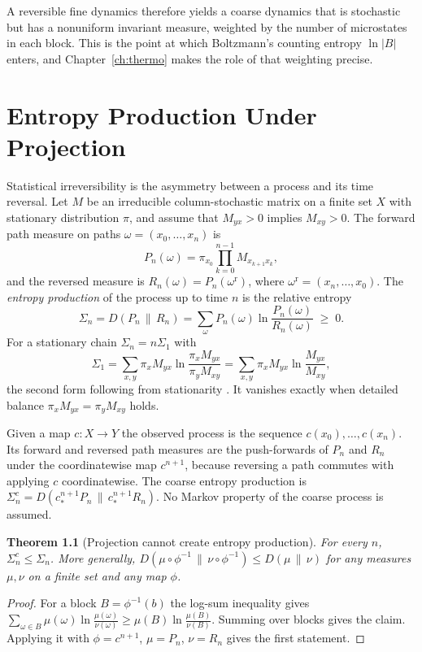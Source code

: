 \documentclass[11pt,oneside]{book}
\newtheorem{theorem}{Theorem}[chapter]
\theoremstyle{definition}
\theoremstyle{remark}
\begin{document}
A reversible fine dynamics therefore yields a coarse dynamics that is stochastic but has a nonuniform invariant measure, weighted by the number of microstates in each block. This is the point at which Boltzmann's counting entropy $\ln|B|$ enters, and Chapter~\ref{ch:thermo} makes the role of that weighting precise.

\chapter{Entropy Production Under Projection}\label{ch:entropy}

Statistical irreversibility is the asymmetry between a process and its time reversal. Let $M$ be an irreducible column-stochastic matrix on a finite set $X$ with stationary distribution $\pi$, and assume that $M_{yx}>0$ implies $M_{xy}>0$. The forward path measure on paths $\omega=(x_0,\dots,x_n)$ is
\[
P_n(\omega)=\pi_{x_0}\prod_{k=0}^{n-1}M_{x_{k+1}x_k},
\]
and the reversed measure is $R_n(\omega)=P_n(\omega^{\mathrm r})$, where $\omega^{\mathrm r}=(x_n,\dots,x_0)$. The \emph{entropy production} of the process up to time $n$ is the relative entropy
\[
\Sigma_n=D(P_n\,\|\,R_n)=\sum_\omega P_n(\omega)\ln\frac{P_n(\omega)}{R_n(\omega)}\;\geq\;0 .
\]
For a stationary chain $\Sigma_n=n\Sigma_1$ with
\[
\Sigma_1=\sum_{x,y}\pi_xM_{yx}\ln\frac{\pi_xM_{yx}}{\pi_yM_{xy}}=\sum_{x,y}\pi_xM_{yx}\ln\frac{M_{yx}}{M_{xy}},
\]
the second form following from stationarity \cite{schnakenberg1976}. It vanishes exactly when detailed balance $\pi_xM_{yx}=\pi_yM_{xy}$ holds.

Given a map $c\colon X\to Y$ the observed process is the sequence $c(x_0),\dots,c(x_n)$. Its forward and reversed path measures are the push-forwards of $P_n$ and $R_n$ under the coordinatewise map $c^{n+1}$, because reversing a path commutes with applying $c$ coordinatewise. The coarse entropy production is $\Sigma_n^{c}=D(c^{n+1}_*P_n\,\|\,c^{n+1}_*R_n)$. No Markov property of the coarse process is assumed.

\begin{theorem}[Projection cannot create entropy production]\label{thm:dpi}
For every $n$, $\Sigma_n^{c}\leq\Sigma_n$. More generally, $D(\mu\circ\phi^{-1}\,\|\,\nu\circ\phi^{-1})\leq D(\mu\,\|\,\nu)$ for any measures $\mu,\nu$ on a finite set and any map $\phi$.
\end{theorem}

\begin{proof}
For a block $B=\phi^{-1}(b)$ the log-sum inequality gives $\sum_{\omega\in B}\mu(\omega)\ln\frac{\mu(\omega)}{\nu(\omega)}\geq\mu(B)\ln\frac{\mu(B)}{\nu(B)}$. Summing over blocks gives the claim. Applying it with $\phi=c^{n+1}$, $\mu=P_n$, $\nu=R_n$ gives the first statement.
\end{proof}
\end{document}
